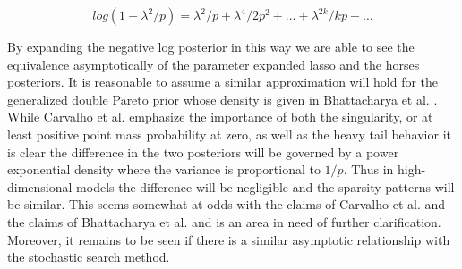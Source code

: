 \begin{equation}\label{eqn:taylor_log_one_plus_x}
log(1+\lambda^2/p) = \lambda^2/p + \lambda^4/2p^2 + \dots+ \lambda^{2k}/kp + \dots
\end{equation}

By expanding the negative log posterior in this way we are able to see the equivalence asymptotically of the parameter expanded lasso and the horses posteriors. It is reasonable to assume a similar approximation will hold for the generalized double Pareto prior  whose density is given in Bhattacharya et al. \cite{bhattacharya2012bayesian}. While Carvalho et al. \cite{carvalho2010horseshoe} emphasize the importance of both the singularity, or at least positive point mass probability at zero, as well as the heavy tail behavior it is clear the difference in the two posteriors will be governed by a power exponential density where the variance is proportional to $1/p$. Thus in high-dimensional models the difference will be negligible and the sparsity patterns will be similar. This seems somewhat at odds with the claims of Carvalho et al. and the claims of Bhattacharya et al. and is an area in need of further clarification. Moreover, it remains to be seen if there is a similar asymptotic relationship with the stochastic search method. 



 